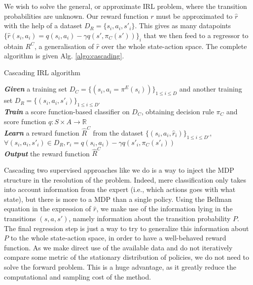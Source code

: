 \documentclass[11pt]{article}
\begin{document}
We wish to solve the general, or approximate IRL problem, where the transition probabilities are unknown. Our reward function $r$ must be approximated to $\hat r$ with the help of a dataset $D_R = \{s_i,a_i,s'_i\}$. This gives as many datapoints $\{\hat r(s_i,a_i) = q(s_i,a_i) - \gamma q(s',\pi_C(s'))\}_i$ that we then feed to a regressor to obtain $R^C$, a generalisation of $\hat r$ over the whole state-action space. The complete algorithm is given Alg. \ref{algo:cascading}.
\begin{algorithm}%
  \caption{Cascading IRL algorithm}
  \label{algo:cascading}
  \emph{\textbf{Given}} a training set $D_C=\{(s_i,a_i=\pi^E(s_i))\}_{1\leq i \leq D}$ and another training set $D_R=\{(s_{i},a_{i},s'_{i})\}_{1\leq i \leq D'}$\;\\
  \emph{\textbf{Train}} a score function-based classifier on $D_C$, obtaining decision rule $\pi_C$ and score function $q:S\times A \rightarrow \mathbb R$\;\\
  \emph{\textbf{Learn}} a reward function $\hat R^C$ from the dataset $\{(s_{i},a_{i},\hat{r}_i)\}_{1\leq i \leq D'}$, $\forall (s_i,a_i,s'_i) \in D_R,\hat{r}_i=q(s_{i},a_{i})-\gamma q(s'_{i},\pi_C(s'_{i}))$\;\\
  \emph{\textbf{Output}} the reward function $\hat R^{C}$ \;
\end{algorithm}

Cascading two supervised approaches like we do is a way to inject the MDP structure in the resolution of the problem. Indeed, mere classification only takes into account information from the expert (i.e., which actions goes with what state), but there is more to a MDP than a single policy. Using the Bellman equation in the expression of $\hat r$, we make use of the information lying in the transitions $(s,a,s')$, namely information about the transition probability $P$. The final regression step is just a way to try to generalize this information about $P$ to the whole state-action space, in order to have a well-behaved reward function. As we make direct use of the available data and do not iteratively compare some metric of the stationary distribution of policies, we do not need to solve the forward problem. This is a huge advantage, as it greatly reduce the computational and sampling cost of the method.
\end{document}
